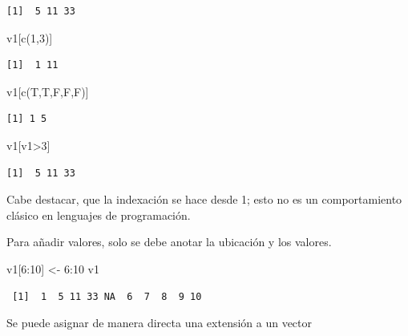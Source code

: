 \documentclass[
  letterpaper,
  DIV=11,
  numbers=noendperiod]{scrartcl}
\newenvironment{Shaded}{\begin{snugshade}}{\end{snugshade}}
\newcommand{\DecValTok}[1]{\textcolor[rgb]{0.68,0.00,0.00}{#1}}
\newcommand{\FunctionTok}[1]{\textcolor[rgb]{0.28,0.35,0.67}{#1}}
\newcommand{\NormalTok}[1]{\textcolor[rgb]{0.00,0.23,0.31}{#1}}
\newcommand{\OtherTok}[1]{\textcolor[rgb]{0.00,0.23,0.31}{#1}}
\newcommand{\SpecialCharTok}[1]{\textcolor[rgb]{0.37,0.37,0.37}{#1}}
\begin{document}
\begin{verbatim}
[1]  5 11 33
\end{verbatim}

\begin{Shaded}
\begin{Highlighting}[]
\NormalTok{v1[}\FunctionTok{c}\NormalTok{(}\DecValTok{1}\NormalTok{,}\DecValTok{3}\NormalTok{)]        }
\end{Highlighting}
\end{Shaded}

\begin{verbatim}
[1]  1 11
\end{verbatim}

\begin{Shaded}
\begin{Highlighting}[]
\NormalTok{v1[}\FunctionTok{c}\NormalTok{(T,T,F,F,F)]  }
\end{Highlighting}
\end{Shaded}

\begin{verbatim}
[1] 1 5
\end{verbatim}

\begin{Shaded}
\begin{Highlighting}[]
\NormalTok{v1[v1}\SpecialCharTok{\textgreater{}}\DecValTok{3}\NormalTok{]  }
\end{Highlighting}
\end{Shaded}

\begin{verbatim}
[1]  5 11 33
\end{verbatim}

Cabe destacar, que la indexación se hace desde 1; esto no es un
comportamiento clásico en lenguajes de programación.

Para añadir valores, solo se debe anotar la ubicación y los valores.

\begin{Shaded}
\begin{Highlighting}[]
\NormalTok{v1[}\DecValTok{6}\SpecialCharTok{:}\DecValTok{10}\NormalTok{] }\OtherTok{\textless{}{-}} \DecValTok{6}\SpecialCharTok{:}\DecValTok{10}
\NormalTok{v1}
\end{Highlighting}
\end{Shaded}

\begin{verbatim}
 [1]  1  5 11 33 NA  6  7  8  9 10
\end{verbatim}

Se puede asignar de manera directa una extensión a un vector
\end{document}
